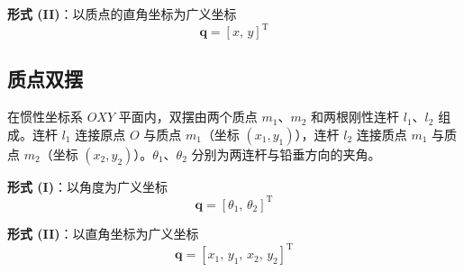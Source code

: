 \textbf{形式 (II)}：以质点的直角坐标为广义坐标
\begin{equation*}
\boldsymbol{q} = [x,\, y]^{\mathrm{T}} \tag{II}
\end{equation*}

\subsection*{质点双摆}

在惯性坐标系 $OXY$ 平面内，双摆由两个质点 $m_1$、$m_2$ 和两根刚性连杆 $l_1$、$l_2$ 组成。连杆 $l_1$ 连接原点 $O$ 与质点 $m_1$（坐标 $(x_1, y_1)$），连杆 $l_2$ 连接质点 $m_1$ 与质点 $m_2$（坐标 $(x_2, y_2)$）。$\theta_1$、$\theta_2$ 分别为两连杆与铅垂方向的夹角。

\textbf{形式 (I)}：以角度为广义坐标
\begin{equation*}
\boldsymbol{q} = [\theta_1,\, \theta_2]^{\mathrm{T}} \tag{I}
\end{equation*}

\textbf{形式 (II)}：以直角坐标为广义坐标
\begin{equation*}
\boldsymbol{q} = [x_1,\, y_1,\, x_2,\, y_2]^{\mathrm{T}} \tag{II}
\end{equation*}

